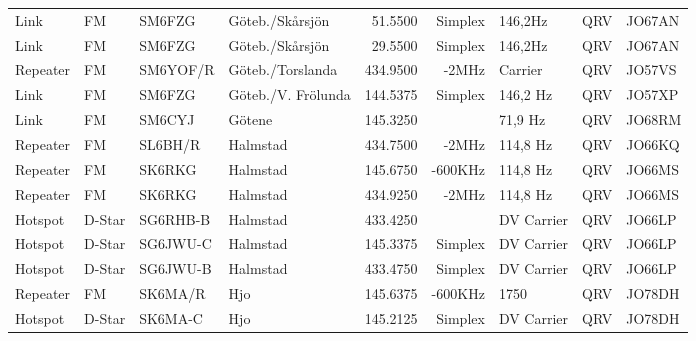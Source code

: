 \begin{landscape}
\begin{longtable}{llllrrlcl}
	Link              & FM           & SM6FZG        & Göteb./Skårsjön     &           51.5500 &        Simplex & 146,2Hz         &       QRV       & JO67AN           \\
	Link              & FM           & SM6FZG        & Göteb./Skårsjön     &           29.5500 &        Simplex & 146,2Hz         &       QRV       & JO67AN           \\
	Repeater          & FM           & SM6YOF/R      & Göteb./Torslanda    &          434.9500 &          -2MHz & Carrier         &       QRV       & JO57VS           \\
	Link              & FM           & SM6FZG        & Göteb./V. Frölunda  &          144.5375 &        Simplex & 146,2 Hz        &       QRV       & JO57XP           \\
	Link              & FM           & SM6CYJ        & Götene              &          145.3250 &                & 71,9 Hz         &       QRV       & JO68RM           \\
	Repeater          & FM           & SL6BH/R       & Halmstad            &          434.7500 &          -2MHz & 114,8 Hz        &       QRV       & JO66KQ           \\
	Repeater          & FM           & SK6RKG        & Halmstad            &          145.6750 &        -600KHz & 114,8 Hz        &       QRV       & JO66MS           \\
	Repeater          & FM           & SK6RKG        & Halmstad            &          434.9250 &          -2MHz & 114,8 Hz        &       QRV       & JO66MS           \\
	Hotspot           & D-Star       & SG6RHB-B      & Halmstad            &          433.4250 &                & DV Carrier      &       QRV       & JO66LP           \\
	Hotspot           & D-Star       & SG6JWU-C      & Halmstad            &          145.3375 &        Simplex & DV Carrier      &       QRV       & JO66LP           \\
	Hotspot           & D-Star       & SG6JWU-B      & Halmstad            &          433.4750 &        Simplex & DV Carrier      &       QRV       & JO66LP           \\
	Repeater          & FM           & SK6MA/R       & Hjo                 &          145.6375 &        -600KHz & 1750            &       QRV       & JO78DH           \\
	Hotspot           & D-Star       & SK6MA-C       & Hjo                 &          145.2125 &        Simplex & DV Carrier      &       QRV       & JO78DH           \\

\end{longtable}
\end{landscape}
